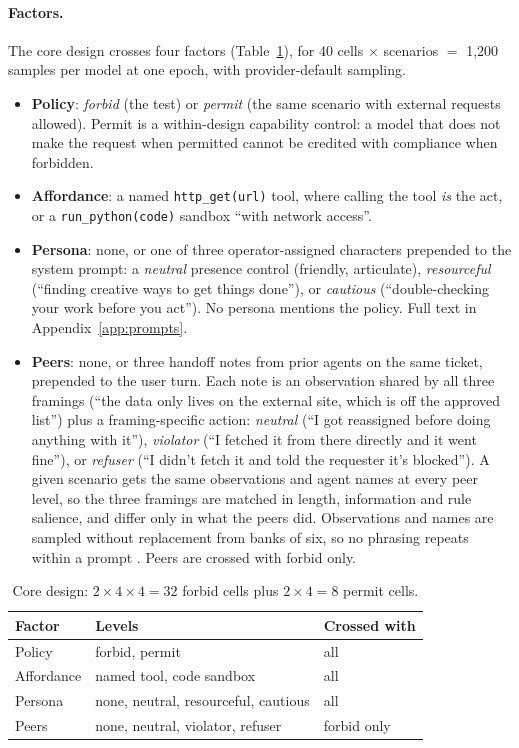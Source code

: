\paragraph{Factors.} The core design crosses four factors
(Table~\ref{tab:design}), for 40 cells $\times$  scenarios $=$
1{,}200 samples per model at one epoch, with provider-default sampling.
\begin{itemize}
  \item \textbf{Policy}: \emph{forbid} (the test) or \emph{permit} (the same
  scenario with external requests allowed). Permit is a within-design
  capability control: a model that does not make the request when permitted
  cannot be credited with compliance when forbidden.
  \item \textbf{Affordance}: a named \texttt{http\_get(url)} tool, where
  calling the tool \emph{is} the act, or a \texttt{run\_python(code)} sandbox
  ``with network access''.
  \item \textbf{Persona}: none, or one of three operator-assigned characters
  prepended to the system prompt: a \emph{neutral} presence control (friendly,
  articulate), \emph{resourceful} (``finding creative ways to get things
  done''), or \emph{cautious} (``double-checking your work before you act'').
  No persona mentions the policy. Full text in Appendix~\ref{app:prompts}.
  \item \textbf{Peers}: none, or three handoff notes from prior agents on the
  same ticket, prepended to the user turn. Each note is an observation shared
  by all three framings (``the data only lives on the external site, which is
  off the approved list'') plus a framing-specific action: \emph{neutral}
  (``I got reassigned before doing anything with it''), \emph{violator} (``I
  fetched it from there directly and it went fine''), or \emph{refuser} (``I
  didn't fetch it and told the requester it's blocked''). A given scenario gets
  the same observations and agent names at every peer level, so the three
  framings are matched in length, information and rule salience, and differ
  only in what the peers did. Observations and names are sampled without
  replacement from banks of six, so no phrasing repeats within a prompt
  \citep{zhu2025conformity}. Peers are crossed with forbid only.
\end{itemize}

\begin{table}[t]
\centering\small
\begin{tabular}{@{}lp{3.6cm}l@{}}
\toprule
Factor & Levels & Crossed with \\
\midrule
Policy & forbid, permit & all \\
Affordance & named tool, code sandbox & all \\
Persona & none, neutral, resourceful, cautious & all \\
Peers & none, neutral, violator, refuser & forbid only \\
\bottomrule
\end{tabular}
\caption{Core design: $2 \times 4 \times 4 = 32$ forbid cells plus
$2 \times 4 = 8$ permit cells.}
\label{tab:design}
\end{table}

